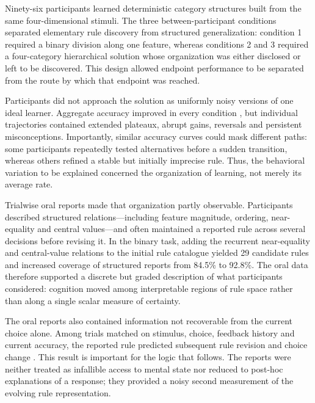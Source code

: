 Ninety-six participants learned deterministic category structures built from
the same four-dimensional stimuli. The three between-participant conditions
separated elementary rule discovery from structured generalization: condition
1 required a binary division along one feature, whereas conditions 2 and 3
required a four-category hierarchical solution whose organization was either
disclosed or left to be discovered. This design allowed endpoint performance
to be separated from the route by which that endpoint was reached.

Participants did not approach the solution as uniformly noisy versions of one
ideal learner. Aggregate accuracy improved in every condition
, but individual trajectories contained extended
plateaux, abrupt gains, reversals and persistent misconceptions.
 Importantly, similar accuracy curves could
mask different paths: some participants repeatedly tested alternatives before
a sudden transition, whereas others refined a stable but initially imprecise
rule. Thus, the behavioral variation to be explained concerned the organization
of learning, not merely its average rate.

Trialwise oral reports made that organization partly observable. Participants
described structured relations---including feature magnitude, ordering,
near-equality and central values---and often maintained a reported rule across
several decisions before revising it. In the binary task, adding the recurrent
near-equality and central-value relations to the initial rule catalogue yielded
29 candidate rules and increased coverage of structured reports from 84.5\% to
92.8\%. The oral data therefore supported a discrete but graded description of
what participants considered: cognition moved among interpretable regions of
rule space rather than along a single scalar measure of certainty.

The oral reports also contained information not recoverable from the current
choice alone. Among trials matched on stimulus, choice, feedback history and
current accuracy, the reported rule predicted subsequent rule revision and
choice change . This result is important for the
logic that follows. The reports were neither treated as infallible access to
mental state nor reduced to post-hoc explanations of a response; they provided
a noisy second measurement of the evolving rule representation.

